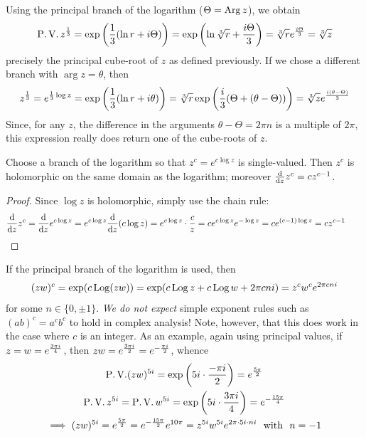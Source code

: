 \begin{example}{}{}
	Using the principal branch of the logarithm ($\Theta=\operatorname{Arg} z$), we obtain
	\[
		\operatorname{P.V.}z^{\frac 13}=\exp\left(\frac 13(\ln r+i\Theta)\right) =\exp\left(\ln \sqrt[3]{r}+\frac{i\Theta}3\right)=\sqrt[3]{r}e^{\frac{i\Theta}{3}} =\sqrt[3]{z}
	\]
	precisely the principal cube-root of $z$ as defined previously.\smallbreak
	If we chose a different branch with $\arg z=\theta$, then
	\[
		z^{\frac 13} =e^{\frac 13\log z}=\exp\left(\frac 13(\ln r+i\theta)\right) =\sqrt[3]{r}\exp\left(\frac i3(\Theta+(\theta-\Theta))\right) =\sqrt[3]{z}e^{\frac{i(\theta-\Theta)}{3}}
	\]
	Since, for any $z$, the difference in the arguments $\theta-\Theta=2\pi n$ is a multiple of $2\pi$, this expression really does return one of the cube-roots of $z$.
\end{example}

\begin{lemm}{}{}
	Choose a branch of the logarithm so that $z^c=e^{c\log z}$ is single-valued. Then $z^c$ is holomorphic on the same domain as the logarithm; moreover $\frac{\mathrm{d} }{\mathrm{d} z}z^c=cz^{c-1}$.
\end{lemm}

\begin{proof}
	Since $\log z$ is holomorphic, simply use the chain rule:
	\[
		\frac{\mathrm{d} }{\mathrm{d} z}z^c=\frac{\mathrm{d} }{\mathrm{d} z}e^{c\log z}=e^{c\log z}\frac{\mathrm{d} }{\mathrm{d} z}(c\log z)=e^{c\log z}\cdot\frac cz =ce^{c\log z}e^{-\log z}=ce^{(c-1)\log z}=cz^{c-1}\tag*{\qedhere}
	\]
\end{proof}

\begin{example}{}{}
	If the principal branch of the logarithm is used, then
  \[
  	(zw)^c=\exp(c\operatorname{Log}(zw))=\exp(c\operatorname{Log} z+c\operatorname{Log} w+2\pi cn i)=z^cw^ce^{2\pi cn i}
  \]
  for some $n\in\{0,\pm 1\}$. \emph{We do not expect} simple exponent rules such as $(ab)^c=a^cb^c$ to hold in complex analysis! Note, however, that this does work in the case where $c$ is an integer.\smallbreak
  As an example, again using principal values, if $z=w=e^{\frac{3\pi i}{4}}$, then $zw=e^{\frac{3\pi i}{2}}=e^{-\frac{\pi i}{2}}$, whence
  \begin{gather*}
  	\operatorname{P.V.}(zw)^{5i}=\exp\left(5i\cdot \frac{-\pi i}2\right) =e^{\frac{5\pi}{2}}\\
  	\operatorname{P.V.}z^{5i}=\operatorname{P.V.}w^{5i}=\exp\left(5i\cdot \frac{3\pi i}4\right) =e^{-\frac{15\pi}{4}}\\
  	\implies (zw)^{5i} =e^{\frac{5\pi}{2}} = e^{-\frac{15\pi}{2}}e^{10\pi} =z^{5i}w^{5i} e^{2\pi\cdot 5i\cdot ni}\ \text{ with } \ n=-1
  \end{gather*}
\end{example}



